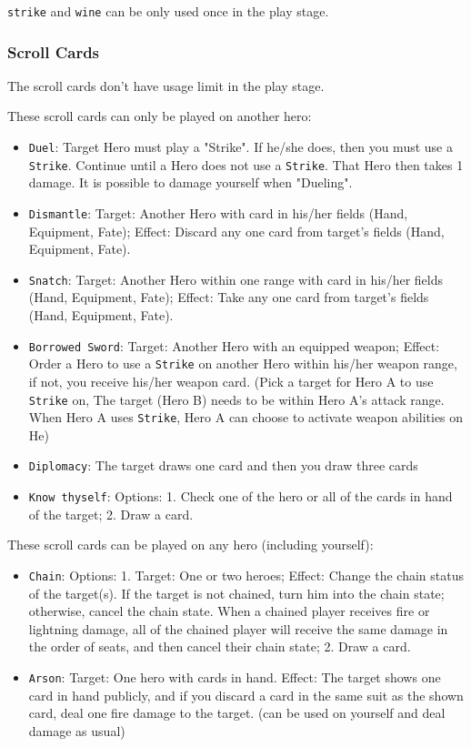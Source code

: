 \documentclass[11pt,a4paper]{article}
\begin{document}
\texttt{strike} and \texttt{wine} can be only used once in the play stage.

\subsubsection{Scroll Cards}

The scroll cards don't have usage limit in the play stage. \bigskip

These scroll cards can only be played on another hero:
\begin{itemize}
\item \texttt{Duel}: Target Hero must play a "Strike". If he/she does, then you must use a \texttt{Strike}. Continue until a Hero does not use a \texttt{Strike}. That Hero then takes 1 damage. It is possible to damage yourself when "Dueling".
\item \texttt{Dismantle}: Target: Another Hero with card in his/her fields (Hand, Equipment, Fate);
Effect: Discard any one card from target's fields (Hand, Equipment, Fate).
\item \texttt{Snatch}: Target: Another Hero within one range with card in his/her fields (Hand, Equipment, Fate);
Effect: Take any one card from target's fields (Hand, Equipment, Fate).
\item \texttt{Borrowed Sword}: Target: Another Hero with an equipped weapon; Effect: Order a Hero to use a \texttt{Strike} on another Hero within his/her weapon range, if not, you receive his/her weapon card. (Pick a target for Hero A to use \texttt{Strike} on, The target (Hero B) needs to be within Hero A's attack range. When Hero A uses \texttt{Strike}, Hero A can choose to activate weapon abilities on He)
\item \texttt{Diplomacy}: The target draws one card and then you draw three cards
\item \texttt{Know thyself}: Options: 1. Check one of the hero or all of the cards in hand of the target; 2. Draw a card.
\end{itemize}

These scroll cards can be played on any hero (including yourself):
\begin{itemize}
\item \texttt{Chain}: Options: 1. Target: One or two heroes; Effect: Change the chain status of the target(s). If the target is not chained, turn him into the chain state; otherwise, cancel the chain state. When a chained player receives fire or lightning damage, all of the chained player will receive the same damage in the order of seats, and then cancel their chain state; 2. Draw a card.
\item \texttt{Arson}: Target: One hero with cards in hand. Effect: The target shows one card in hand publicly, and if you discard a card in the same suit as the shown card, deal one fire damage to the target. (can be used on yourself and deal damage as usual)
\end{itemize}
\end{document}
